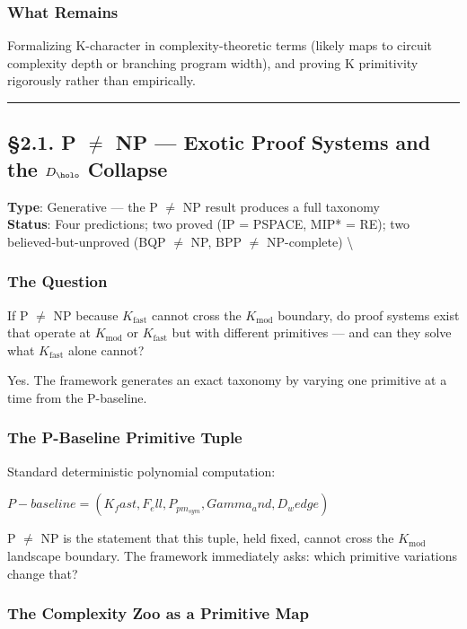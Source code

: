 \documentclass[12pt,a4paper]{article}
\newcommand{\pilcrow}{\S}
\begin{document}
\subsubsection{What Remains}

Formalizing K-character in complexity-theoretic terms (likely maps to circuit complexity depth or branching program width), and proving K primitivity rigorously rather than empirically.

\begin{center}
\rule{0.5\textwidth}{0.4pt}
\end{center}

\subsection{\pilcrow{}2.1. P $\neq$ NP --- Exotic Proof Systems and the $D_{\holo}$ Collapse}

\textbf{Type}: Generative --- the P $\neq$ NP result produces a full taxonomy   \\
\textbf{Status}: Four predictions; two proved (IP = PSPACE, MIP* = RE); two believed-but-unproved (BQP $\neq$ NP, BPP $\neq$ NP-complete)  \textbackslash{}

\subsubsection{The Question}

If P $\neq$ NP because $K_{\text{fast}}$ cannot cross the $K_{\text{mod}}$ boundary, do proof systems exist that operate at $K_{\text{mod}}$ or $K_{\text{fast}}$ but with different primitives --- and can they solve what $K_{\text{fast}}$ alone cannot?

Yes. The framework generates an exact taxonomy by varying one primitive at a time from the P-baseline.

\subsubsection{The P-Baseline Primitive Tuple}

Standard deterministic polynomial computation:

$P-baseline = (K_fast, F_ell, P_{pm_{sym}}, Gamma_and, D_wedge)$

P $\neq$ NP is the statement that this tuple, held fixed, cannot cross the $K_{\text{mod}}$ landscape boundary. The framework immediately asks: which primitive variations change that?

\subsubsection{The Complexity Zoo as a Primitive Map}
\end{document}
